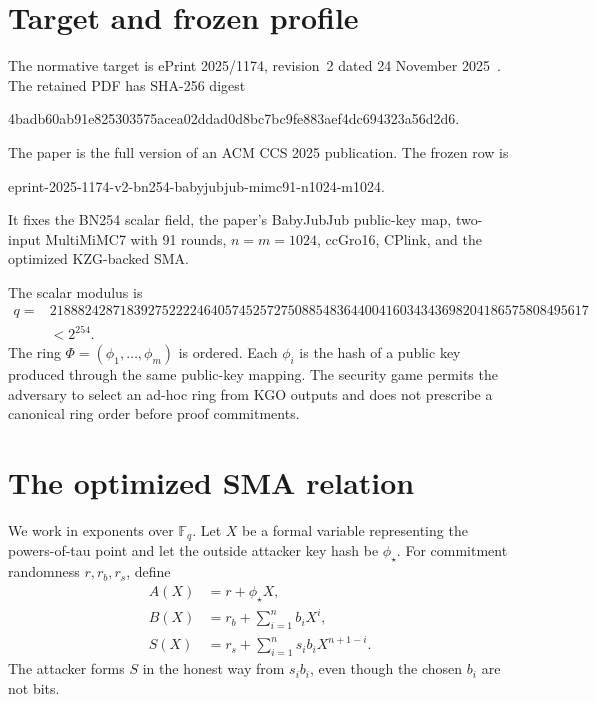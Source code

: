 \documentclass[10pt,a4paper]{article}
\newcommand{\F}{\mathbb{F}_q}
\begin{document}
\section{Target and frozen profile}

The normative target is ePrint 2025/1174, revision~2 dated 24 November
2025~\cite{lrs}. The retained PDF has SHA-256 digest
\begin{center}
\small\ttfamily
4badb60ab91e825303575acea02ddad0d8bc7bc9fe883aef4dc694323a56d2d6.
\end{center}
The paper is the full version of an ACM CCS 2025 publication. The frozen row
is
\begin{center}
\small\ttfamily
eprint-2025-1174-v2-bn254-babyjubjub-mimc91-n1024-m1024.
\end{center}
It fixes the BN254 scalar field, the paper's BabyJubJub public-key map,
two-input MultiMiMC7 with 91 rounds, $n=m=1024$, ccGro16, CPlink, and the
optimized KZG-backed SMA.

The scalar modulus is
\begin{equation}\label{eq:q}
\begin{split}
q={}&21888242871839275222246405745257275088548364400416034343698204186575808495617\\
 &<2^{254}.
\end{split}
\end{equation}
The ring $\Phi=(\phi_1,\ldots,\phi_m)$ is ordered. Each $\phi_i$ is the hash
of a public key produced through the same public-key mapping. The security
game permits the adversary to select an ad-hoc ring from KGO outputs and does
not prescribe a canonical ring order before proof commitments.

\section{The optimized SMA relation}

We work in exponents over $\F$. Let $X$ be a formal variable representing
the powers-of-tau point and let the outside attacker key hash be
$\phi_\star$. For commitment randomness $r,r_b,r_s$, define
\begin{align}
A(X)&=r+\phi_\star X,\label{eq:A}\\
B(X)&=r_b+\sum_{i=1}^{n}b_iX^i,\label{eq:B}\\
S(X)&=r_s+\sum_{i=1}^{n}s_i b_iX^{n+1-i}.\label{eq:S}
\end{align}
The attacker forms $S$ in the honest way from $s_i b_i$, even though the
chosen $b_i$ are not bits.
\end{document}
